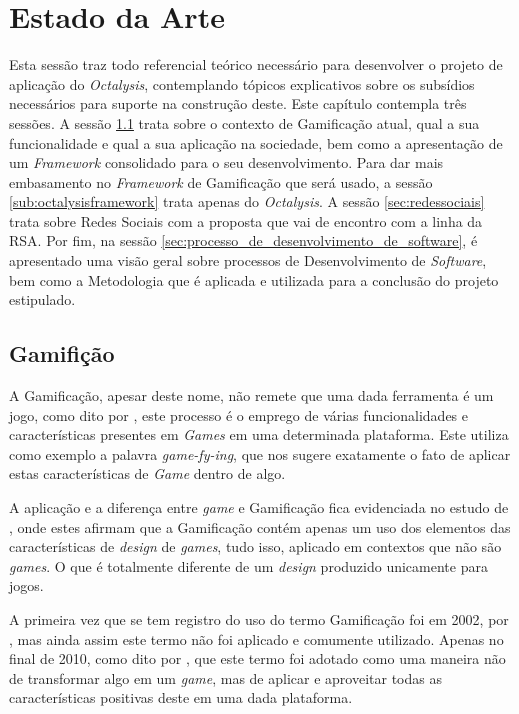 \chapter[Estado da Arte]{Estado da Arte}
Esta sessão traz todo referencial teórico necessário para desenvolver o projeto
de aplicação do \textit{Octalysis}, contemplando tópicos explicativos sobre os subsídios
necessários para suporte na construção deste. Este capítulo contempla três sessões.
A sessão \ref{sec:gamifição} trata sobre o contexto de Gamificação atual, qual a
sua funcionalidade e qual a sua aplicação na sociedade, bem como a apresentação
de um \textit{Framework} consolidado para o seu desenvolvimento. 
Para dar mais embasamento no \textit{Framework} de Gamificação que será usado, a sessão
\ref{sub:octalysisframework} trata apenas do \textit{Octalysis}.
A sessão \ref{sec:redessociais}
trata sobre Redes Sociais com a proposta que vai de encontro com a linha da RSA.
Por fim, na sessão \ref{sec:processo_de_desenvolvimento_de_software},
é apresentado uma visão geral sobre processos de
Desenvolvimento de \textit{Software}, bem como a Metodologia que é aplicada e utilizada
para a conclusão do projeto estipulado.

\section{Gamifição}
\label{sec:gamifição}
A Gamificação, apesar deste nome, não remete que uma dada ferramenta é um jogo,
como dito por \cite{popularitygamification}, este processo é o emprego de
várias funcionalidades e características presentes em \textit{Games} em uma determinada
plataforma. Este utiliza como exemplo a palavra \textit{game-fy-ing}, que nos sugere
exatamente o fato de aplicar estas características de \textit{Game} dentro de algo.

A aplicação e a diferença entre \textit{game} e Gamificação fica evidenciada
no estudo de \cite{deterding2011gamification}, onde estes afirmam que a Gamificação contém  apenas
um uso dos elementos das características de \textit{design} de \textit{games}, tudo isso,
aplicado em contextos que não são \textit{games}. O que é totalmente diferente
de um \textit{design} produzido unicamente para jogos.

A primeira vez que se tem registro do uso do termo Gamificação foi em 2002,
por \cite{pelling}, mas ainda assim este termo não foi aplicado e comumente
utilizado. Apenas no final de 2010, como dito por \cite{deterding2011gamification}, que
este termo foi adotado como uma maneira não de transformar algo em um \textit{game},
mas de aplicar e aproveitar todas as características positivas deste em uma dada
plataforma.

